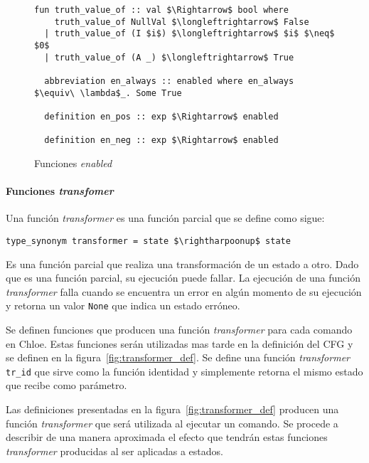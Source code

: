 \begin{figure}
  \begin{lstlisting}[frame=single, mathescape=true]
  fun truth_value_of :: val $\Rightarrow$ bool where
    truth_value_of NullVal $\longleftrightarrow$ False
  | truth_value_of (I $i$) $\longleftrightarrow$ $i$ $\neq$ $0$
  | truth_value_of (A _) $\longleftrightarrow$ True

  abbreviation en_always :: enabled where en_always $\equiv\ \lambda$_. Some True

  definition en_pos :: exp $\Rightarrow$ enabled

  definition en_neg :: exp $\Rightarrow$ enabled
  \end{lstlisting}

  \caption{Funciones \textit{enabled}}
  \label{fig:enabled_def}
\end{figure}


\paragraph*{Funciones \textit{transfomer}}\label{paragraph:transformer}

Una función \textit{transformer} es una función parcial que se define como sigue:

\begin{lstlisting}[mathescape=true, frame=single]
type_synonym transformer = state $\rightharpoonup$ state
\end{lstlisting}

Es una función parcial que realiza una transformación de un estado a otro.
Dado que es una función parcial, su ejecución puede fallar.
La ejecución de una función \textit{transformer} falla cuando se encuentra un error en algún momento de su ejecución y retorna un valor \verb|None| que indica un estado erróneo.

Se definen funciones que producen una función \textit{transformer} para cada comando en Chloe.
Estas funciones serán utilizadas mas tarde en la definición del CFG y se definen en la figura~\ref{fig:transformer_def}.
Se define una función \textit{transformer} \verb|tr_id| que sirve como la función identidad y simplemente retorna el mismo estado que recibe como parámetro.

Las definiciones presentadas en la figura~\ref{fig:transformer_def} producen una función \textit{transformer} que será utilizada al ejecutar un comando.
Se procede a describir de una manera aproximada el efecto que tendrán estas funciones \textit{transformer} producidas al ser aplicadas a estados.


